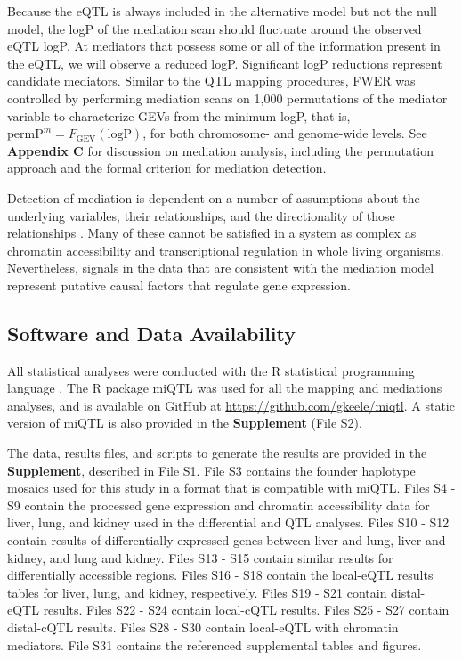 \documentclass[9pt,twocolumn,twoside]{gsajnl}
\newcommand{\permpmed}{\text{permP}^{m}}
\begin{document}
Because the eQTL is always included in the alternative model but not the null model, the logP of the mediation scan should fluctuate around the observed eQTL logP. At mediators that possess some or all of the information present in the eQTL, we will observe a reduced logP. Significant logP reductions represent candidate mediators. Similar to the QTL mapping procedures, FWER was controlled by performing mediation scans on 1,000 permutations of the mediator variable to characterize GEVs from the minimum logP, that is, $\permpmed = F_{\text{GEV}}(\text{logP})$, for both chromosome- and genome-wide levels. See \textbf{Appendix C} for discussion on mediation analysis, including the permutation approach and the formal criterion for mediation detection.

Detection of mediation is dependent on a number of assumptions about the underlying variables, their relationships, and the directionality of those relationships \citep{Mackinnon2007}. Many of these cannot be satisfied in a system as complex as chromatin accessibility and transcriptional regulation in whole living organisms. Nevertheless, signals in the data that are consistent with the mediation model represent putative causal factors that regulate gene expression.

\subsection{Software and Data Availability}

All statistical analyses were conducted with the R statistical programming language \citep{RSoftware2019}. The R package miQTL was used for all the mapping and mediations analyses, and is available on GitHub at \url{https://github.com/gkeele/miqtl}. A static version of miQTL is also provided in the \textbf{Supplement} (File S2).

The data, results files, and scripts to generate the results are provided in the \textbf{Supplement}, described in File S1. 
File S3 contains the founder haplotype mosaics used for this study in a format that is compatible with miQTL. Files S4 - S9 contain the processed gene expression and chromatin accessibility data for liver, lung, and kidney used in the differential and QTL analyses. Files S10 - S12 contain results of differentially expressed genes between liver and lung, liver and kidney, and lung and kidney. Files S13 - S15 contain similar results for differentially accessible regions. Files S16 - S18 contain the local-eQTL results tables for liver, lung, and kidney, respectively. Files S19 - S21 contain distal-eQTL results. Files S22 - S24 contain local-cQTL results. Files S25 - S27 contain distal-cQTL results. Files S28 - S30 contain local-eQTL with chromatin mediators. File S31 contains the referenced supplemental tables and figures.
\end{document}
